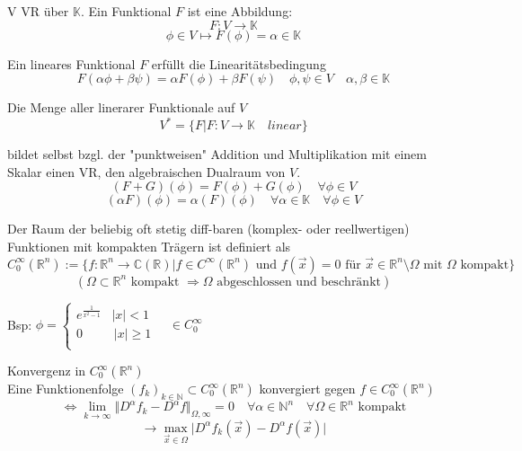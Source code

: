 \begin{Def}
    V VR über $\mathbb{K}$. Ein Funktional $F$ ist eine Abbildung:
    $$F: V \rightarrow \mathbb{K}$$
    $$ \phi \in V \mapsto F(\phi) = \alpha \in \mathbb{K}$$

    Ein lineares Funktional $F$ erfüllt die Linearitätsbedingung
    $$F(\alpha \phi + \beta \psi) = \alpha F(\phi) + \beta F(\psi) \quad \phi , \psi \in V \quad \alpha, \beta \in \mathbb{K} $$

    Die Menge aller linerarer Funktionale auf $V$
    $$V^\ast =  \{ F | F:V \rightarrow \mathbb{K} \quad linear \} $$

    bildet selbst bzgl. der "punktweisen" Addition und Multiplikation
    mit einem Skalar einen VR, den algebraischen Dualraum von $V$.
    $$(F+G)(\phi) = F(\phi) + G(\phi) \quad \forall \phi \in V $$
    $$(\alpha F)(\phi) = \alpha (F)(\phi)  \quad \forall \alpha \in \mathbb{K} \quad \forall \phi \in V $$
\end{Def}

\begin{Def}
    Der Raum der beliebig oft stetig diff-baren (komplex- oder 
    reellwertigen) Funktionen mit kompakten Trägern ist definiert als
    $$C_0^\infty (\mathbb{R}^n)  := \{ f:\mathbb{R}^n \rightarrow \mathbb{C}(\mathbb{R}) | f \in C^\infty(\mathbb{R}^n) \textrm{ und } f(\vec{x})=0 \textrm{ für } \vec{x} \in \mathbb{R}^n \setminus  \Omega \textrm{ mit } \Omega \textrm{ kompakt} \}$$
    $$( \Omega \subset \mathbb{R}^n \textrm{ kompakt } \Rightarrow \Omega \textrm{ abgeschlossen und beschränkt} )$$

    Bsp: $\phi = \left\{ \begin{array}{ll}
        e^{\frac{1}{x^2-1}} & |x| < 1 \\
        0 & \, |x| \geq 1 \\
        \end{array}
        \right. \quad \in C_0^{\infty} $
\end{Def}

\begin{Def}{Konvergenz in $C_0^{\infty}(\mathbb{R}^n)$ \\}
    Eine Funktionenfolge $(f_k)_{k \in \mathbb{N}} \subset C_0^{\infty}(\mathbb{R}^n)$ konvergiert gegen
    $f \in C_0^{\infty}(\mathbb{R}^n)$
    $$\Leftrightarrow \lim_{k\rightarrow \infty} \Vert D^\alpha f_k - D^\alpha f \Vert _{\Omega , \infty} = 0 \quad \forall 
    \alpha \in \mathbb{N}^n \quad \forall \Omega \in \mathbb{R}^n \textrm{ kompakt} $$
    $$ \rightarrow \max_{\vec{x} \in \Omega} \vert D^\alpha f_k(\vec{x}) - D^\alpha f(\vec{x}) \vert$$
\end{Def}

